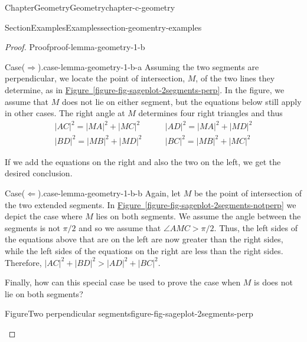 \documentclass[oneside,10pt,]{book}
\newcommand{\xreffont}{\relax}
\numberwithin{equation}{section}
\newcommand{\gt}{>}
\begin{document}
\begin{chapterptx}{Chapter}{Geometry}{}{Geometry}{}{}{chapter-c-geometry}
\begin{sectionptx}{Section}{Examples}{}{Examples}{}{}{section-geomentry-examples}
\begin{proof}{Proof}{}{proof-lemma-geometry-1-b}
\begin{case}{Case}{}{(\(\Rightarrow\)).}{case-lemma-geometry-1-b-a}
Assuming the two segments are perpendicular, we locate the point of intersection, \(M\), of the two lines they determine, as in \hyperref[figure-fig-sageplot-2segments-perp]{Figure~{\xreffont\ref{figure-fig-sageplot-2segments-perp}}}.  In the figure, we assume that \(M\) does not lie on either segment, but the equations below still apply in other cases. The right angle at \(M\) determines four right triangles and thus%
\begin{equation*}
\begin{split}
\lvert AC\rvert^2 = \lvert MA\rvert^2 +\lvert  MC\rvert^2 
\qquad &\lvert AD\rvert^2 =\lvert  MA\rvert^2 + \lvert MD\rvert^2 \\
\lvert BD\rvert^2 = \lvert MB\rvert^2 +\lvert MD\rvert^2 
\qquad &\lvert BC\rvert^2 = \lvert MB\rvert^2 + \lvert MC\rvert^2
\end{split}
\end{equation*}
%
\par
If we add the equations on the right and also the two on the left, we get the desired conclusion.%
\end{case}
\begin{case}{Case}{}{(\(\Leftarrow\)).}{case-lemma-geometry-1-b-b}
Again, let \(M\) be the point of intersection of the two extended segments.  In  \hyperref[figure-fig-sageplot-2segments-notperp]{Figure~{\xreffont\ref{figure-fig-sageplot-2segments-notperp}}} we depict the case where \(M\) lies on both segments.  We assume the angle between the segments is not \(\pi/2\) and so we assume that \(\angle AMC \gt \pi/2\).  Thus, the left sides of the equations above that are on the left are now greater than the right sides, while the left sides of the equations on the right are less than the right sides.  Therefore, \(\lvert AC \rvert^2 +  \lvert BD \rvert^2 \gt \lvert AD \rvert^2 + \lvert BC \rvert^2\).%
\par
Finally, how can this special case be used to prove the case when \(M\) is does not lie on both segments?%
\end{case}
\begin{sidebyside}{2}{0}{0}{0}%
\begin{sbspanel}{0.5}%
\begin{panelfigureptx}{Figure}{Two perpendicular segments}{figure-fig-sageplot-2segments-perp}{}%

\end{panelfigureptx}
\end{sbspanel}
\end{sidebyside}
\end{proof}
\end{sectionptx}
\end{chapterptx}
\end{document}
